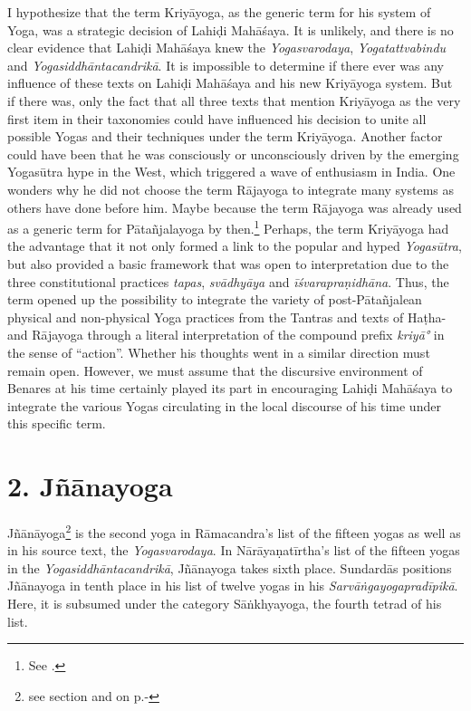 I hypothesize that the term Kriyāyoga, as the generic term for his system of Yoga, was a strategic decision of Lahiḍi Mahāśaya. It is unlikely, and there is no clear evidence that Lahiḍi Mahāśaya knew the \textit{Yogasvarodaya}, \textit{Yogatattvabindu} and \textit{Yogasiddhāntacandrikā}. It is impossible to determine if there ever was any influence of these texts on Lahiḍi Mahāśaya and his new Kriyāyoga system. But if there was, only the fact that all three texts that mention Kriyāyoga as the very first item in their taxonomies could have influenced his decision to unite all possible Yogas and their techniques under the term Kriyāyoga. Another factor could have been that he was consciously or unconsciously driven by the emerging Yogasūtra hype in the West, which triggered a wave of enthusiasm in India. One wonders why he did not choose the term Rājayoga to integrate many systems as others have done before him. Maybe because the term Rājayoga was already used as a generic term for Pātañjalayoga by then.\footnote{See \citeauthor{birch2014}.} Perhaps, the term Kriyāyoga had the advantage that it not only formed a link to the popular and hyped \textit{Yogasūtra}, but also provided a basic framework that was open to interpretation due to the three constitutional practices \textit{tapas}, \textit{svādhyāya} and \textit{īśvarapraṇidhāna}. Thus, the term opened up the possibility to integrate the variety of post-Pātañjalean physical and non-physical Yoga practices from the Tantras and texts of Haṭha- and Rājayoga through a literal interpretation of the compound prefix \textit{kriyā°} in the sense of ``action''. Whether his thoughts went in a similar direction must remain open. However, we must assume that the discursive environment of Benares at his time certainly played its part in encouraging Lahiḍi Mahāśaya to integrate the various Yogas circulating in the local discourse of his time under this specific term.

\section{2. Jñānayoga}
\label{jnanayogaintro}

Jñānāyoga\footnote{see section  and  on p.\pageref{jnanayogastart}-\pageref{endsvabhava}} is the second yoga in Rāmacandra's list of the fifteen yogas as well as in his source text, the \textit{Yogasvarodaya}. In Nārāyaṇatīrtha's list of the fifteen yogas in the \textit{Yogasiddhāntacandrikā}, Jñānayoga takes sixth place. Sundardās positions Jñānayoga in tenth place in his list of twelve yogas in his \textit{Sarvāṅgayogapradīpikā}. Here, it is subsumed under the category Sāṅkhyayoga, the fourth tetrad of his list. 

